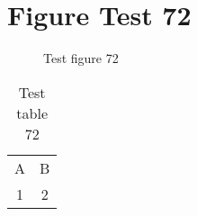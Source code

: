 \documentclass{article}
\begin{document}
\section{Figure Test 72}
\begin{figure}[h]
\caption{Test figure 72}
\end{figure}
\begin{table}[h]
\caption{Test table 72}
\begin{tabular}{cc}
A & B \\
1 & 2
\end{tabular}
\end{table}
\end{document}
